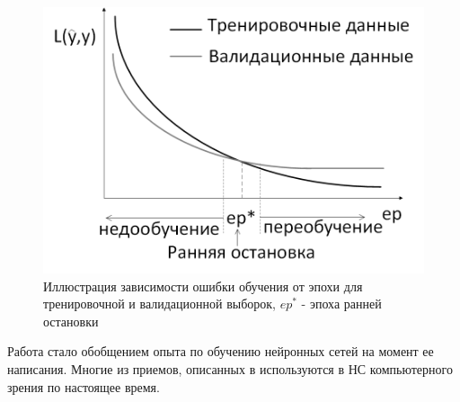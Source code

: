 \documentclass[12pt]{article}
\begin{document}
\begin{sloppypar}
\begin{itemize}
    \begin{figure}[!h]
	\begin{center}
		\includegraphics[width=0.75\linewidth]{./figuresch1/early_stop_cv.png}
		\caption{Иллюстрация зависимости ошибки обучения от эпохи для тренировочной и валидационной выборок, $ep^*$ - эпоха ранней остановки}		
		\label{ch1:fig:early_stop_cv}
	\end{center}
    \end{figure}
\end{itemize}

Работа \cite{lecun1998efficient} стало обобщением опыта по обучению нейронных сетей на момент ее написания. Многие из приемов, описанных в \cite{lecun1998efficient} используются в НС компьютерного зрения по настоящее время.


\end{sloppypar}
\end{document}
